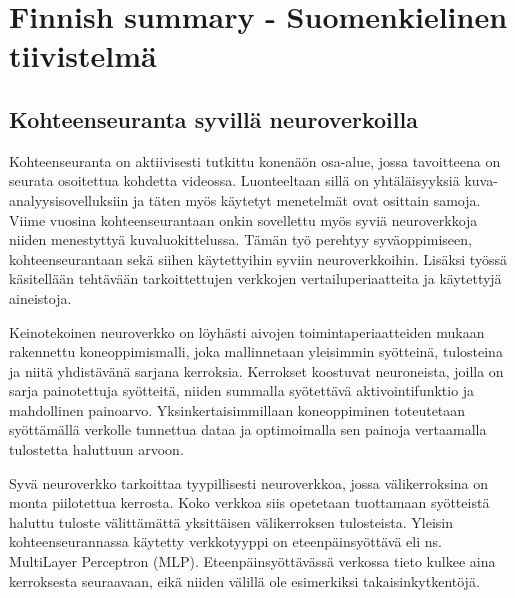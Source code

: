 \section{Finnish summary - Suomenkielinen tiivistelmä}

\clearpage

\setcounter{subsection}{-1}
\let\oldsubsection=\thesubsection
\renewcommand{\thesubsection}{\thesection}

\subsection{Kohteenseuranta syvillä neuroverkoilla}

Kohteenseuranta on aktiivisesti tutkittu konenäön osa-alue, jossa tavoitteena on seurata
osoitettua kohdetta videossa. Luonteeltaan sillä on yhtäläisyyksiä kuva-analyysisovelluksiin
ja täten myös käytetyt menetelmät ovat osittain samoja. Viime vuosina kohteenseurantaan onkin
sovellettu myös syviä neuroverkkoja niiden menestyttyä kuvaluokittelussa. Tämän työ perehtyy
syväoppimiseen, kohteenseurantaan sekä siihen käytettyihin syviin neuroverkkoihin. Lisäksi
työssä käsitellään tehtävään tarkoittettujen verkkojen vertailuperiaatteita ja käytettyjä
aineistoja.

Keinotekoinen neuroverkko on löyhästi aivojen toimintaperiaatteiden mukaan rakennettu 
koneoppimismalli, joka mallinnetaan yleisimmin syötteinä, tulosteina ja niitä yhdistävänä
sarjana kerroksia. Kerrokset koostuvat neuroneista, joilla on sarja painotettuja syötteitä,
niiden summalla syötettävä aktivointifunktio ja mahdollinen painoarvo. Yksinkertaisimmillaan
koneoppiminen toteutetaan syöttämällä verkolle tunnettua dataa ja optimoimalla sen painoja
vertaamalla tulostetta haluttuun arvoon. 

Syvä neuroverkko tarkoittaa tyypillisesti neuroverkkoa, jossa välikerroksina on monta
piilotettua kerrosta. Koko verkkoa siis opetetaan tuottamaan syötteistä haluttu tuloste
välittämättä yksittäisen välikerroksen tulosteista. Yleisin kohteenseurannassa käytetty
verkkotyyppi on eteenpäinsyöttävä eli ns. MultiLayer Perceptron (MLP). Eteenpäinsyöttävässä
verkossa tieto kulkee aina kerroksesta seuraavaan, eikä niiden välillä ole esimerkiksi
takaisinkytkentöjä.

\renewcommand{\thesubsection}{\oldsubsection}
